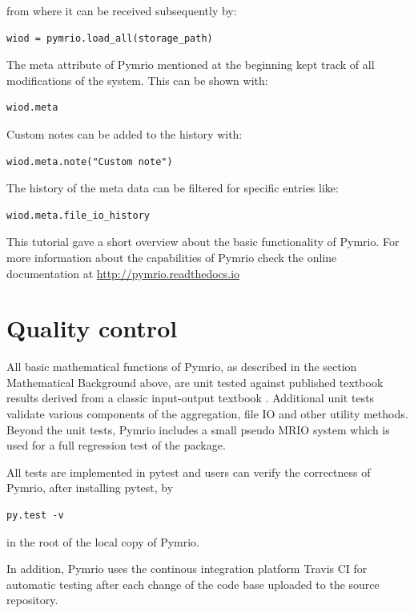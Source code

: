 \documentclass{jors}
\begin{document}
{from where it can be received subsequently by:

\begin{lstlisting}
wiod = pymrio.load_all(storage_path)
\end{lstlisting}

The meta attribute of Pymrio mentioned at the beginning kept track of all modifications of the system.
This can be shown with:

\begin{lstlisting}
wiod.meta
\end{lstlisting}

Custom notes can be added to the history with:
\begin{lstlisting}
wiod.meta.note("Custom note")
\end{lstlisting}


The history of the meta data can be filtered for specific entries like:

\begin{lstlisting}
wiod.meta.file_io_history
\end{lstlisting}


This tutorial gave a short overview about the basic functionality of Pymrio. 
For more information about the capabilities of Pymrio check the online documentation at 
\url{http://pymrio.readthedocs.io} 
\cite{stadler2018}



\section*{Quality control}

All basic mathematical functions of Pymrio, as described in the section Mathematical Background above, are unit tested against published textbook results derived from a classic input-output textbook \cite{miller2009}.
Additional unit tests validate various components of the aggregation, file IO and other utility methods.
Beyond the unit tests, Pymrio includes a small pseudo MRIO system which is used for a full regression test of the package.

All tests are implemented in pytest \cite{krekl2017} and users can verify the correctness of Pymrio, after installing pytest, by

\begin{lstlisting}
py.test -v
\end{lstlisting}

in the root of the local copy of Pymrio.

In addition, Pymrio uses the continous integration platform Travis CI \cite{travis2018} for automatic testing after each change of the code base uploaded to the source repository. 

}
\end{document}
